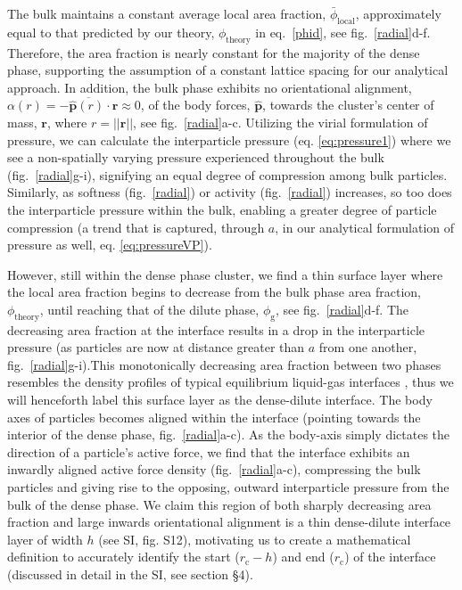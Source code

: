 \documentclass[twoside,twocolumn,9pt]{article}
\begin{document}
The bulk maintains a constant average local area fraction, $\bar{\phi}_\text{local}$, approximately equal to that predicted by our theory, $\phi_\text{theory}$ in eq.~\ref{phid}, see fig.~\ref{radial}d-f. Therefore, the area fraction is nearly constant for the majority of the dense phase, supporting the assumption of a constant lattice spacing for our analytical approach.  In addition, the bulk phase exhibits no orientational alignment, $\alpha(r)=\overline{-\hat{\mathbf{p}}(r)\cdot \mathbf{r}}\approx0$, of the body forces, $\hat{\mathbf{p}}$, towards the cluster's center of mass, $\mathbf{r}$, where $r=||\mathbf{r}||$, see fig.~\ref{radial}a-c. Utilizing the virial formulation of pressure, we can calculate the interparticle pressure (eq. \ref{eq:pressure1}) where we see a non-spatially varying pressure experienced throughout the bulk (fig.~\ref{radial}g-i), signifying an equal degree of compression among bulk particles. Similarly, as softness (fig.~\ref{radial}) or activity (fig.~\ref{radial}) increases, so too does the interparticle pressure within the bulk, enabling a greater degree of particle compression (a trend that is captured, through $a$, in our analytical formulation of pressure as well, eq. \ref{eq:pressureVP}). 

However, still within the dense phase cluster, we find a thin surface layer where the local area fraction begins to decrease from the bulk phase area fraction, $\phi_\text{theory}$, until reaching that of the dilute phase, $\phi_\text{g}$, see fig.~\ref{radial}d-f. The decreasing area fraction at the interface results in a drop in the interparticle pressure (as particles are now at distance greater than $a$ from one another, fig.~\ref{radial}g-i).This monotonically decreasing area fraction between two phases resembles the density profiles of typical equilibrium liquid-gas interfaces \cite{Miyazaki1975, Weeks1977a, Chapela1977}, thus we will henceforth label this surface layer as the dense-dilute interface. The body axes of particles becomes aligned within the interface (pointing towards the interior of the dense phase, fig.~\ref{radial}a-c). As the body-axis simply dictates the direction of a particle's active force, we find that the interface exhibits an inwardly aligned active force density (fig.~\ref{radial}a-c), compressing the bulk particles and giving rise to the opposing, outward interparticle pressure from the bulk of the dense phase. We claim this region of both sharply decreasing area fraction and large inwards orientational alignment is a thin dense-dilute interface layer of width $h$ (see SI, fig. S12), motivating us to create a mathematical definition to accurately identify the start ($r_\text{c}-h$) and end ($r_\text{c}$) of the interface (discussed in detail in the SI, see section \S 4). 
\end{document}
